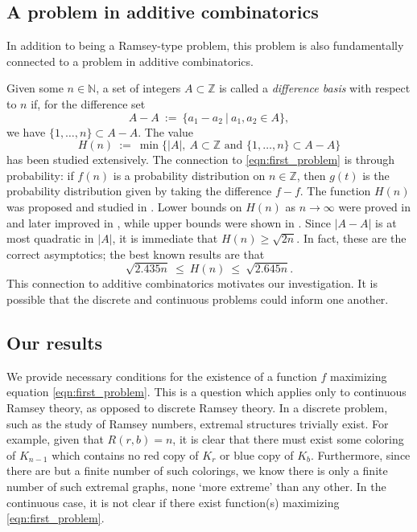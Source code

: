 \documentclass[11pt,reqno]{amsart}
\numberwithin{equation}{section}
\theoremstyle{plain}
\begin{document}
\subsection{A problem in additive combinatorics}
In addition to being a Ramsey-type problem, this problem is also fundamentally connected to a problem in additive combinatorics.

Given some $n \in \mathbb{N}$, a set of integers $A \subset \mathbb{Z}$ is called a \textit{difference basis} with respect to $n$ if, for the difference set
\begin{equation}
A-A \ :=\ \{a_1-a_2\ |\ a_1,a_2 \in A\},
\end{equation}
we have $\{1,\dots, n \} \subset A-A$. The value
\begin{equation}
    H(n)\ :=\  \min\{|A|,\  A \subset \mathbb{Z} \text{ and } \{1,\dots, n\} \subset A-A \}
\end{equation}
has been studied extensively. The connection to \eqref{eqn:first_problem} is through probability: if $f(n)$ is a probability distribution on $n \in \mathbb{Z}$, then $g(t)$ is the probability distribution given by taking the difference $f-f$. The function $H(n)$ was proposed and studied in \cite{PKHJ,EG,HL,B}. Lower bounds on $H(n)$ as $n \to \infty$ were proved in \cite{L} and later improved in \cite{BT}, while upper bounds were shown in \cite{G}. Since $|A-A|$ is at most quadratic in $|A|$, it is immediate that $H(n) \geq \sqrt{2n}$. In fact, these are the correct asymptotics; the best known results are that
\begin{equation}
    \sqrt{2.435n}\ \le\ H(n) \ \le\ \sqrt{2.645 n}.
\end{equation}
This connection to additive combinatorics motivates our investigation. It is possible that the discrete and continuous problems could inform one another.

\subsection{Our results}
We provide necessary conditions for the existence of a function $f$ maximizing equation \eqref{eqn:first_problem}. This is a question which applies only to continuous Ramsey theory, as opposed to discrete Ramsey theory. In a discrete problem, such as the study of Ramsey numbers, extremal structures trivially exist. For example, given that $R(r,b) = n$, it is clear that there must exist some coloring of $K_{n-1}$ which contains no red copy of $K_r$ or blue copy of $K_b$. Furthermore, since there are but a finite number of such colorings, we know there is only a finite number of such extremal graphs, none `more extreme' than any other. In the continuous case, it is not clear if there exist function(s) maximizing \eqref{eqn:first_problem}.
\end{document}
